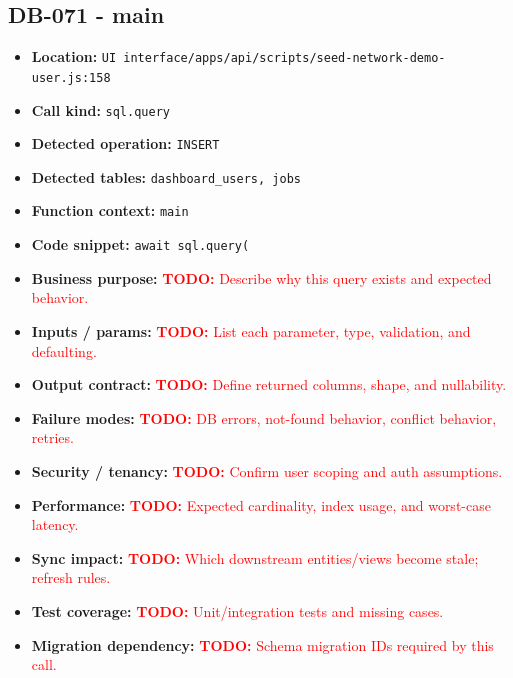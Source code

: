 \documentclass[11pt]{article}
\newcommand{\todoitem}[1]{\textcolor{red}{\textbf{TODO:} #1}}
\begin{document}
\subsection{DB-071 - main}
\begin{itemize}[leftmargin=1.5em]
\item \textbf{Location:} \texttt{UI interface/apps/api/scripts/seed-network-demo-user.js:158}
\item \textbf{Call kind:} \texttt{sql.query}
\item \textbf{Detected operation:} \texttt{INSERT}
\item \textbf{Detected tables:} \texttt{dashboard\_users, jobs}
\item \textbf{Function context:} \texttt{main}
\item \textbf{Code snippet:} \texttt{await sql.query(}
\item \textbf{Business purpose:} \todoitem{Describe why this query exists and expected behavior.}
\item \textbf{Inputs / params:} \todoitem{List each parameter, type, validation, and defaulting.}
\item \textbf{Output contract:} \todoitem{Define returned columns, shape, and nullability.}
\item \textbf{Failure modes:} \todoitem{DB errors, not-found behavior, conflict behavior, retries.}
\item \textbf{Security / tenancy:} \todoitem{Confirm user scoping and auth assumptions.}
\item \textbf{Performance:} \todoitem{Expected cardinality, index usage, and worst-case latency.}
\item \textbf{Sync impact:} \todoitem{Which downstream entities/views become stale; refresh rules.}
\item \textbf{Test coverage:} \todoitem{Unit/integration tests and missing cases.}
\item \textbf{Migration dependency:} \todoitem{Schema migration IDs required by this call.}
\end{itemize}
\end{document}
